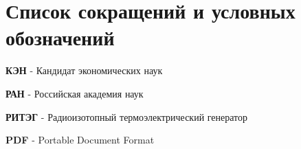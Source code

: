 \chapter*{Список сокращений и условных обозначений}             %

\textbf{КЭН} - Кандидат экономических наук

\textbf{РАН} - Российская академия наук

\textbf{РИТЭГ} - Радиоизотопный термоэлектрический генератор

\textbf{PDF} - Portable Document Format
